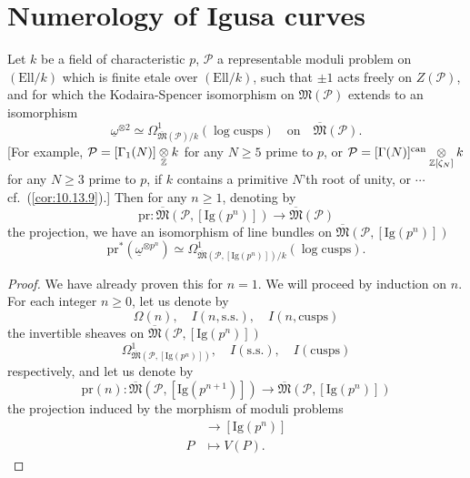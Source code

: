 \section{Numerology of Igusa curves}
\label{sec:12.9}

\begin{kthm}\label{thm:12.9.1}\label{item:12.9.1}
Let $k$ be a field of characteristic $p$, $\mathcal{P}$ a representable moduli problem on $(\mathrm{Ell}/k)$ which is finite etale over $(\mathrm{Ell}/k)$, such that $\pm 1$ acts freely on $Z(\mathcal{P})$, and for which the Kodaira-Spencer isomorphism on $\mathfrak{M}(\mathcal{P})$ extends to an isomorphism
\[
\underline{\omega}^{\otimes 2} \simeq \Omega^1_{\overline{\mathfrak{M}}(\mathcal{P})/k}(\log\mathrm{cusps}) \quad\text{on}\quad \overline{\mathfrak{M}}(\mathcal{P}) .
\]
[For example, $\mathcal{P} = [\Gamma_1(N)] \underset{\mathbb{Z}}{\otimes} k$ for any $N \ge 5$ prime to $p$, or $\mathcal{P} = [\Gamma(N)]^{\mathrm{can}} \underset{\mathbb{Z}[\zeta_N]}{\otimes} k$ for any $N \ge 3$ prime to $p$, if $k$ contains a primitive $N$'th root of unity, or $\cdots$ cf.~(\ref{cor:10.13.9}).] Then for any $n \ge 1$, denoting by
\[
\mathrm{pr} : \overline{\mathfrak{M}}(\mathcal{P}, [\mathrm{Ig}(p^n)]) \to \overline{\mathfrak{M}}(\mathcal{P})
\]
the projection, we have an isomorphism of line bundles on $\overline{\mathfrak{M}}(\mathcal{P}, [\mathrm{Ig}(p^n)])$
\[
\mathrm{pr}^*(\underline{\omega}^{\otimes p^n}) \simeq \Omega^1_{\overline{\mathfrak{M}}(\mathcal{P}, [\mathrm{Ig}(p^n)])/k}(\log\mathrm{cusps}) .
\]
\end{kthm}

\begin{proof}
We have already proven this for $n = 1$. We will proceed by induction on $n$. For each integer $n \ge 0$, let us denote by
\[
\Omega(n) ,\quad I(n, \mathrm{s.s.}) ,\quad I(n, \mathrm{cusps})
\]
the invertible sheaves on $\overline{\mathfrak{M}}(\mathcal{P}, [\mathrm{Ig}(p^n)])$
\[
\Omega^1_{\overline{\mathfrak{M}}(\mathcal{P}, [\mathrm{Ig}(p^n)])} ,\quad I(\mathrm{s.s.}) ,\quad I(\mathrm{cusps})
\]
respectively, and let us denote by
\[
\mathrm{pr}(n) : \overline{\mathfrak{M}}(\mathcal{P}, [\mathrm{Ig}(p^{n+1})]) \to \overline{\mathfrak{M}}(\mathcal{P}, [\mathrm{Ig}(p^n)])
\]
the projection induced by the morphism of moduli problems
\begin{align*}
[\mathrm{Ig}(p^{n+1})] &\to [\mathrm{Ig}(p^n)] \\
P &\mapsto V(P) .
\end{align*}
\end{proof}

